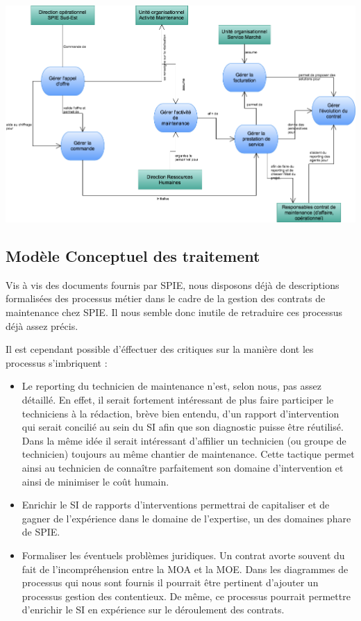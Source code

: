 \begin {center}
\includegraphics[width=\textwidth]{png/DiagrammeModeleActivite.png}
\end {center}

\subsection{Modèle Conceptuel des traitement} 
Vis à vis des documents fournis par SPIE, nous disposons déjà de descriptions formalisées des processus métier dans le cadre de la gestion des contrats de maintenance chez SPIE. Il nous semble donc inutile de retraduire ces processus déjà assez précis.

Il est cependant possible d'éffectuer des critiques sur la manière dont les processus s'imbriquent :

\begin{itemize}
\item Le reporting du technicien de maintenance n'est, selon nous, pas assez détaillé. En effet, il serait fortement intéressant de plus faire participer le techniciens à la rédaction, brève bien entendu, d'un rapport d'intervention qui serait concilié au sein du SI afin que son diagnostic puisse être réutilisé. Dans la même idée il serait intéressant d'affilier un technicien (ou groupe de technicien) toujours au même chantier de maintenance. Cette tactique permet ainsi au technicien de connaître parfaitement son domaine d'intervention et ainsi de minimiser le coût humain.
\item Enrichir le SI de rapports d'interventions permettrai de capitaliser et de gagner de l'expérience dans le domaine de l'expertise, un des domaines phare de SPIE.
\item Formaliser les éventuels problèmes juridiques. Un contrat avorte souvent du fait de l'incompréhension entre la MOA et la MOE. Dans les diagrammes de processus qui nous sont fournis il pourrait être pertinent d'ajouter un processus gestion des contentieux. De même, ce processus pourrait permettre d'enrichir le SI en expérience sur le déroulement des contrats.
\end{itemize}


